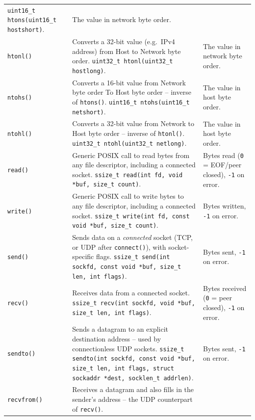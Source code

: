 \documentclass[11pt]{article}
\begin{document}
\begin{longtable}{p{2.6cm}p{6.3cm}p{5.3cm}}
\texttt{uint16\_t htons(uint16\_t hostshort)}. &
The value in network byte order. \\
\texttt{htonl()} & Converts a 32-bit value (e.g.\ IPv4 address) from Host to Network byte order. \newline
\texttt{uint32\_t htonl(uint32\_t hostlong)}. &
The value in network byte order. \\
\texttt{ntohs()} & Converts a 16-bit value from Network byte order To Host byte order -- inverse of \texttt{htons()}. \newline
\texttt{uint16\_t ntohs(uint16\_t netshort)}. &
The value in host byte order. \\
\texttt{ntohl()} & Converts a 32-bit value from Network to Host byte order -- inverse of \texttt{htonl()}. \newline
\texttt{uint32\_t ntohl(uint32\_t netlong)}. &
The value in host byte order. \\
\texttt{read()} & Generic POSIX call to read bytes from any file descriptor, including a connected socket. \newline
\texttt{ssize\_t read(int fd, void *buf, size\_t count)}. &
Bytes read (\texttt{0} = EOF/peer closed), \texttt{-1} on error. \\
\texttt{write()} & Generic POSIX call to write bytes to any file descriptor, including a connected socket. \newline
\texttt{ssize\_t write(int fd, const void *buf, size\_t count)}. &
Bytes written, \texttt{-1} on error. \\
\texttt{send()} & Sends data on a \emph{connected} socket (TCP, or UDP after \texttt{connect()}), with socket-specific flags. \newline
\texttt{ssize\_t send(int sockfd, const void *buf, size\_t len, int flags)}. &
Bytes sent, \texttt{-1} on error. \\
\texttt{recv()} & Receives data from a connected socket. \newline
\texttt{ssize\_t recv(int sockfd, void *buf, size\_t len, int flags)}. &
Bytes received (\texttt{0} = peer closed), \texttt{-1} on error. \\
\texttt{sendto()} & Sends a datagram to an explicit destination address -- used by connectionless UDP sockets. \newline
\texttt{ssize\_t sendto(int sockfd, const void *buf, size\_t len, int flags, struct sockaddr *dest, socklen\_t addrlen)}. &
Bytes sent, \texttt{-1} on error. \\
\texttt{recvfrom()} & Receives a datagram and also fills in the sender's address -- the UDP counterpart of \texttt{recv()}. \newline

\end{longtable}
\end{document}
